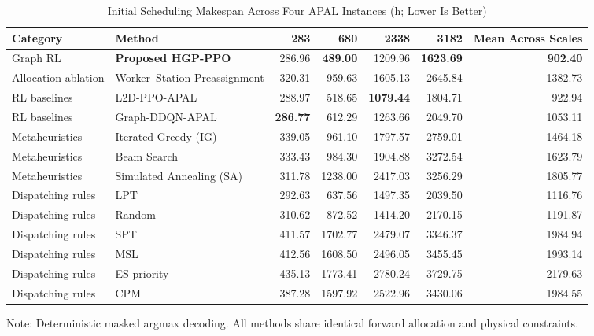 \documentclass[journal,10pt]{IEEEtran}
\renewcommand{\arraystretch}{1.06}
\begin{document}
\begin{table}[!t]
\centering
\caption{Initial Scheduling Makespan Across Four APAL Instances (h; Lower Is Better)}
\label{tab:initial_results}
\setlength{\tabcolsep}{8pt}
\renewcommand{\arraystretch}{1.06}
\begin{adjustbox}{max width=\textwidth}
\begin{tabular}{@{}llrrrrr@{}}
\toprule
\textbf{Category} & \textbf{Method} & \textbf{283} & \textbf{680} & \textbf{2338} & \textbf{3182} & \textbf{Mean Across Scales} \\
\midrule
Graph RL & \textbf{Proposed HGP-PPO} & 286.96 & \textbf{489.00} & 1209.96 & \textbf{1623.69} & \textbf{902.40} \\
Allocation ablation & Worker--Station Preassignment & 320.31 & 959.63 & 1605.13 & 2645.84 & 1382.73 \\
RL baselines & L2D-PPO-APAL & 288.97 & 518.65 & \textbf{1079.44} & 1804.71 & 922.94 \\
RL baselines & Graph-DDQN-APAL & \textbf{286.77} & 612.29 & 1263.66 & 2049.70 & 1053.11 \\
Metaheuristics & Iterated Greedy (IG) & 339.05 & 961.10 & 1797.57 & 2759.01 & 1464.18 \\
Metaheuristics & Beam Search & 333.43 & 984.30 & 1904.88 & 3272.54 & 1623.79 \\
Metaheuristics & Simulated Annealing (SA) & 311.78 & 1238.00 & 2417.03 & 3256.29 & 1805.77 \\
Dispatching rules & LPT & 292.63 & 637.56 & 1497.35 & 2039.50 & 1116.76 \\
Dispatching rules & Random & 310.62 & 872.52 & 1414.20 & 2170.15 & 1191.87 \\
Dispatching rules & SPT & 411.57 & 1702.77 & 2479.07 & 3346.37 & 1984.94 \\
Dispatching rules & MSL & 412.56 & 1608.50 & 2496.05 & 3455.45 & 1993.14 \\
Dispatching rules & ES-priority & 435.13 & 1773.41 & 2780.24 & 3729.75 & 2179.63 \\
Dispatching rules & CPM & 387.28 & 1597.92 & 2522.96 & 3430.06 & 1984.55 \\
\bottomrule
\end{tabular}
\end{adjustbox}
\par\smallskip
{\footnotesize Note: Deterministic masked argmax decoding. All methods share identical forward allocation and physical constraints.}
\end{table}
\end{document}
